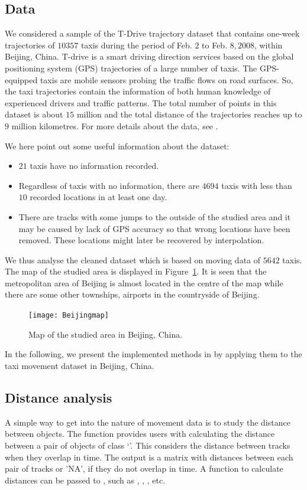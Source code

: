 \documentclass[article]{jss}
\newcommand{\class}[1]{`\code{#1}'}
\begin{document}
\subsection{Data}
 We considered a sample of the T-Drive trajectory dataset that contains one-week trajectories of $10357$ taxis during the period of Feb. $2$ to Feb. $8, 2008$, within Beijing, China. T-drive is a smart driving direction services based on the global positioning system (GPS) trajectories of a large number of taxis. The GPS-equipped taxis are mobile sensors probing the traffic flows on road surfaces. So, the taxi trajectories contain the information of both human knowledge of experienced drivers and traffic patterns. The total number of points in this dataset is about $15$ million and the total distance of the trajectories reaches up to $9$ million kilometres. For more details about the data, see \cite{yuan10,yuan11}. 
  
We here point out some useful information about the dataset:
\begin{itemize}
  \item $21$ taxis have no information recorded.
  \item Regardless of taxis with no information, there are $4694$ taxis with less than $10$ recorded locations in at least one day. 
  \item There are tracks with some jumps to the outside of the studied area and it may be caused by lack of GPS accuracy so that wrong locations have been removed. These locations might later be recovered by interpolation.
\end{itemize}
  We thus analyse the cleaned dataset which is based on moving data of $5642$ taxis. The map of the studied area is displayed in Figure~\ref{Beijingmapgoogle}. It is seen that the metropolitan area of Beijing is almost located in the centre of the map while there are some other townships, airports in the countryside of Beijing.
  \begin{figure}[!h]
  \centering
  \texttt{[image: Beijingmap]}
  \caption{Map of the studied area in Beijing, China.}
  \label{Beijingmapgoogle}
  \end{figure}
  
  In the following, we present the implemented methods in  by applying them to the taxi movement dataset in Beijing, China. 
\subsection{Distance analysis}\label{distanal}
  A simple way to get into the nature of movement data is to study the distance between objects. The function  provides users with calculating the distance between a pair of objects of class \class{Tracks}. This considers the distance between tracks when they overlap in time. The output is a matrix with distances between each pair of tracks or 'NA', if they do not overlap in time. A function to calculate distances can be passed to , such as , , , etc.
\end{document}
